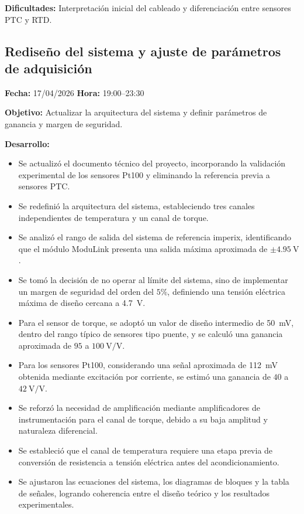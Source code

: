 \documentclass[12pt]{article}
\begin{document}
\textbf{Dificultades:}
Interpretación inicial del cableado y diferenciación entre sensores PTC y RTD.


\subsection{Rediseño del sistema y ajuste de parámetros de adquisición}
\textbf{Fecha:} 17/04/2026 \quad \textbf{Hora:} 19:00--23:30

\textbf{Objetivo:}
Actualizar la arquitectura del sistema y definir parámetros de ganancia y margen de seguridad.

\textbf{Desarrollo:}
\begin{itemize}
\item Se actualizó el documento técnico del proyecto, incorporando la validación experimental de los sensores Pt100 y eliminando la referencia previa a sensores PTC.
\item Se redefinió la arquitectura del sistema, estableciendo tres canales independientes de temperatura y un canal de torque.
\item Se analizó el rango de salida del sistema de referencia imperix, identificando que el módulo ModuLink presenta una salida máxima aproximada de \(\pm 4.95\ \mathrm{V}\).
\item Se tomó la decisión de no operar al límite del sistema, sino de implementar un margen de seguridad del orden del \(5\%\), definiendo una tensión eléctrica máxima de diseño cercana a \SI{4.7}{V}.
\item Para el sensor de torque, se adoptó un valor de diseño intermedio de \SI{50}{mV}, dentro del rango típico de sensores tipo puente, y se calculó una ganancia aproximada de \(95\) a \(100\ \mathrm{V/V}\).
\item Para los sensores Pt100, considerando una señal aproximada de \SI{112}{mV} obtenida mediante excitación por corriente, se estimó una ganancia de \(40\) a \(42\ \mathrm{V/V}\).
\item Se reforzó la necesidad de amplificación mediante amplificadores de instrumentación para el canal de torque, debido a su baja amplitud y naturaleza diferencial.
\item Se estableció que el canal de temperatura requiere una etapa previa de conversión de resistencia a tensión eléctrica antes del acondicionamiento.
\item Se ajustaron las ecuaciones del sistema, los diagramas de bloques y la tabla de señales, logrando coherencia entre el diseño teórico y los resultados experimentales.
\end{itemize}
\end{document}

